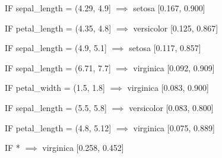 IF sepal_length = (4.29, 4.9] $\implies$ setosa [0.167, 0.900]

IF petal_length = (4.35, 4.8] $\implies$ versicolor [0.125, 0.867]

IF sepal_length = (4.9, 5.1] $\implies$ setosa [0.117, 0.857]

IF sepal_length = (6.71, 7.7] $\implies$ virginica [0.092, 0.909]

IF petal_width = (1.5, 1.8] $\implies$ virginica [0.083, 0.900]

IF sepal_length = (5.5, 5.8] $\implies$ versicolor [0.083, 0.800]

IF petal_length = (4.8, 5.12] $\implies$ virginica [0.075, 0.889]

IF * $\implies$ virginica [0.258, 0.452]
